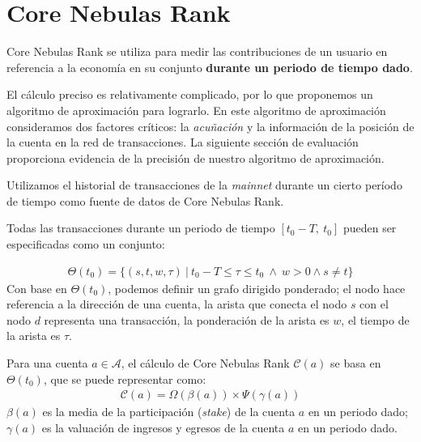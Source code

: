 \section{Core Nebulas Rank}

Core Nebulas Rank se utiliza para medir las contribuciones de un usuario en referencia a la economía en su conjunto {\textbf{durante un periodo de tiempo dado}}.

El cálculo preciso es relativamente complicado, por lo que proponemos un algoritmo de aproximación para lograrlo. En este algoritmo de aproximación consideramos dos factores críticos: la \textit{acuñación} y la información de la posición de la cuenta en la red de transacciones. La siguiente sección de evaluación proporciona evidencia de la precisión de nuestro algoritmo de aproximación.

Utilizamos el historial de transacciones de la \textit{mainnet} durante un cierto período de tiempo como fuente de datos de Core Nebulas Rank.

Todas las transacciones durante un periodo de tiempo $[t_0-T,\ t_0]$ pueden ser especificadas como un conjunto:

\begin{align}
\Theta(t_0) = \{(s, t, w, \tau)\ |\ t_0 - T \le \tau \le t_0\ \land \ w > 0 \land s \neq t \}
\end{align}
\noindent Con base en $\Theta(t_0)$, podemos definir un grafo dirigido ponderado; el nodo hace referencia a la dirección de una cuenta, la arista que conecta el nodo $s$ con el nodo $d$ representa una transacción, la ponderación de la arista es $w$, el tiempo de la arista es $\tau$.

Para una cuenta $a \in \mathcal{A}$, el cálculo de Core Nebulas Rank $\mathcal{C}(a)$ se basa en $\Theta(t_0)$, que se puede representar como:
\begin{align}
\mathcal{C}(a) = \Omega(\beta(a)) \times{} \Psi(\gamma(a))
\label{eq:rank}
\end{align}
\noindent $\beta(a)$ es la media de la participación (\textit{stake}) de la cuenta $a$ en un periodo dado; $\gamma(a)$ es la valuación de ingresos y egresos de la cuenta $a$ en un periodo dado.


